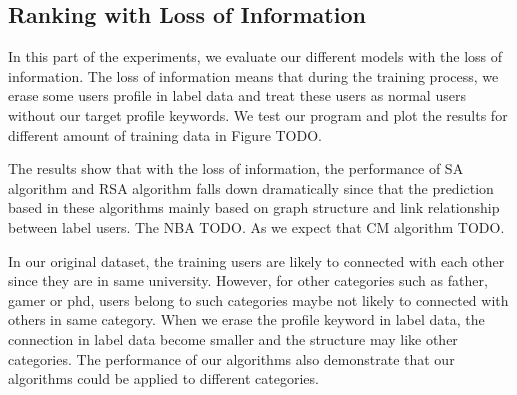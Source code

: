 \documentclass{article}
\begin{document}
\subsection{Ranking with Loss of Information}
In this part of the experiments, we evaluate our different models with the loss of information. The loss of information means that during the training process, we erase some users profile in label data and treat these users as normal users without our target profile keywords. We test our program and plot the results for different amount of training data in Figure TODO.

The results show that with the loss of information, the performance of SA algorithm and RSA algorithm falls down dramatically since that the prediction based in these algorithms mainly based on graph structure and link relationship between label users. The NBA TODO. As we expect that CM algorithm TODO.

In our original dataset, the training users are likely to connected with each other since they are in same university. However, for other categories such as father, gamer or phd, users belong to such categories maybe not likely to connected with others in same category. When we erase the profile keyword in label data, the connection in label data become smaller and the structure may like other categories. The performance of our algorithms also demonstrate that our algorithms could be applied to different categories.

\ifx \allfiles \undefined
\end{document}
